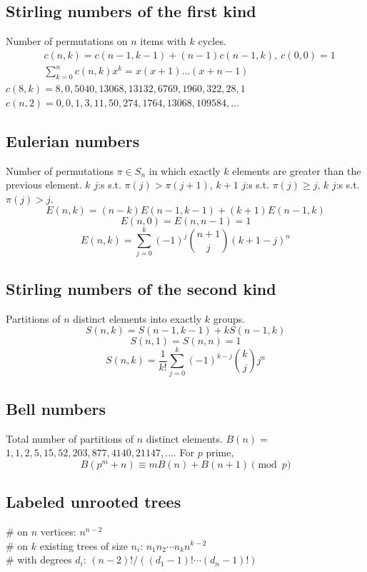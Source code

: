 	\subsection{Stirling numbers of the first kind}
		Number of permutations on $n$ items with $k$ cycles.
		\begin{align*}
			&c(n,k) = c(n-1,k-1) + (n-1) c(n-1,k),\ c(0,0) = 1 \\
			&\textstyle \sum_{k=0}^n c(n,k)x^k = x(x+1) \dots (x+n-1)
		\end{align*}
		$c(8,k) = 8, 0, 5040, 13068, 13132, 6769, 1960, 322, 28, 1$ \\
		$c(n,2) = 0, 0, 1, 3, 11, 50, 274, 1764, 13068, 109584, \dots$

	\subsection{Eulerian numbers}
		Number of permutations $\pi \in S_n$ in which exactly $k$ elements are greater than the previous element. $k$ $j$:s s.t. $\pi(j)>\pi(j+1)$, $k+1$ $j$:s s.t. $\pi(j)\geq j$, $k$ $j$:s s.t. $\pi(j)>j$.
		$$E(n,k) = (n-k)E(n-1,k-1) + (k+1)E(n-1,k)$$
		$$E(n,0) = E(n,n-1) = 1$$
		$$E(n,k) = \sum_{j=0}^k(-1)^j\binom{n+1}{j}(k+1-j)^n$$

	\subsection{Stirling numbers of the second kind}
		Partitions of $n$ distinct elements into exactly $k$ groups.
		$$S(n,k) = S(n-1,k-1) + k S(n-1,k)$$
		$$S(n,1) = S(n,n) = 1$$
		$$S(n,k) = \frac{1}{k!}\sum_{j=0}^k (-1)^{k-j}\binom{k}{j}j^n$$

	\subsection{Bell numbers}
		Total number of partitions of $n$ distinct elements. $B(n) =$
		$1, 1, 2, 5, 15, 52, 203, 877, 4140, 21147, \dots$. For $p$ prime,
		\[ B(p^m+n)\equiv mB(n)+B(n+1) \pmod{p} \]

	\subsection{Labeled unrooted trees}
		\# on $n$ vertices: $n^{n-2}$ \\
		\# on $k$ existing trees of size $n_i$: $n_1n_2\cdots n_k n^{k-2}$ \\
		\# with degrees $d_i$: $(n-2)! / ((d_1-1)! \cdots (d_n-1)!)$

